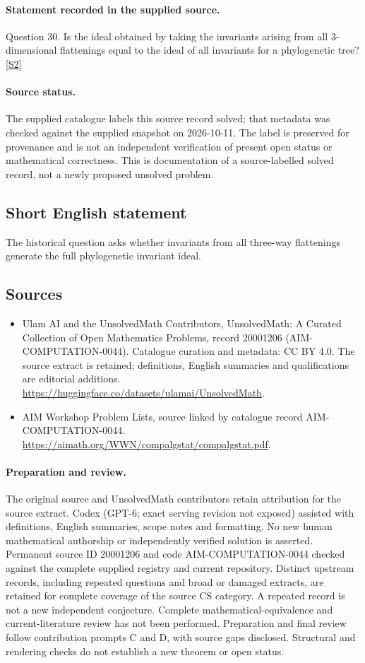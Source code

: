 \documentclass[11pt]{article}
\begin{document}
\paragraph{Statement recorded in the supplied source.}
Question 30. Is the ideal obtained by taking the invariants arising from all 3-dimensional flattenings equal to the ideal of all invariants for a phylogenetic tree? \href{https://aimath.org/WWN/compalgstat/compalgstat.pdf}{[S2]}
\paragraph{Source status.}
The supplied catalogue labels this source record solved; that metadata was checked against the supplied snapshot on 2026-10-11. The label is preserved for provenance and is not an independent verification of present open status or mathematical correctness. This is documentation of a source-labelled solved record, not a newly proposed unsolved problem.
\subsection{Short English statement}
The historical question asks whether invariants from all three-way flattenings generate the full phylogenetic invariant ideal.
\subsection{Sources}
\begin{itemize}
\item[S1] Ulam AI and the UnsolvedMath Contributors, UnsolvedMath: A Curated Collection of Open Mathematics Problems, record 20001206 (AIM-COMPUTATION-0044). Catalogue curation and metadata: CC BY 4.0. The source extract is retained; definitions, English summaries and qualifications are editorial additions.
\url{https://huggingface.co/datasets/ulamai/UnsolvedMath}.
\item[S2] AIM Workshop Problem Lists, source linked by catalogue record AIM-COMPUTATION-0044.
\url{https://aimath.org/WWN/compalgstat/compalgstat.pdf}.
\end{itemize}
\paragraph{Preparation and review.}
The original source and UnsolvedMath contributors retain attribution for the source extract. Codex (GPT-6; exact serving revision not exposed) assisted with definitions, English summaries, scope notes and formatting. No new human mathematical authorship or independently verified solution is asserted. Permanent source ID 20001206 and code AIM-COMPUTATION-0044 checked against the complete supplied registry and current repository. Distinct upstream records, including repeated questions and broad or damaged extracts, are retained for complete coverage of the source CS category. A repeated record is not a new independent conjecture. Complete mathematical-equivalence and current-literature review has not been performed. Preparation and final review follow contribution prompts C and D, with source gaps disclosed. Structural and rendering checks do not establish a new theorem or open status.
\label{end:20001206}
\end{document}
